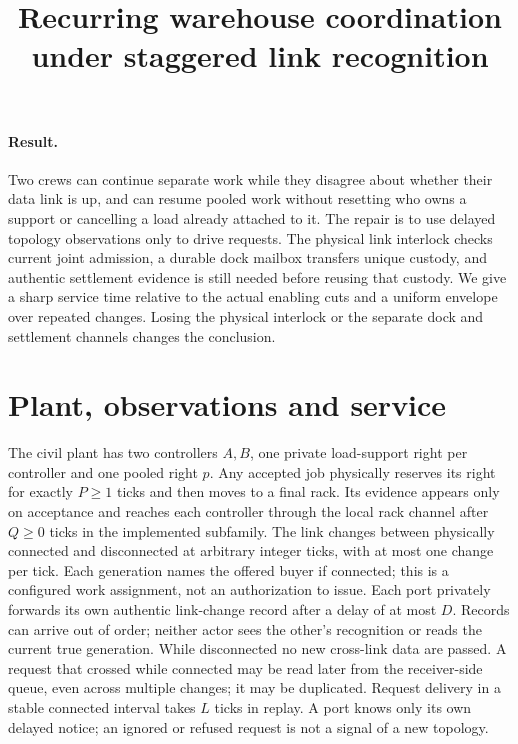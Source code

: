 \documentclass[11pt]{article}
\title{Recurring warehouse coordination under staggered link recognition}
\date{}
\begin{document}
\maketitle

\paragraph{Result.}
Two crews can continue separate work while they disagree about whether their data link is up, and can resume pooled work without resetting who owns a support or cancelling a load already attached to it. The repair is to use delayed topology observations only to drive requests. The physical link interlock checks current joint admission, a durable dock mailbox transfers unique custody, and authentic settlement evidence is still needed before reusing that custody. We give a sharp service time relative to the actual enabling cuts and a uniform envelope over repeated changes. Losing the physical interlock or the separate dock and settlement channels changes the conclusion.

\section{Plant, observations and service}
The civil plant has two controllers $A,B$, one private load-support right per controller and one pooled right $p$. Any accepted job physically reserves its right for exactly $P\ge1$ ticks and then moves to a final rack. Its evidence appears only on acceptance and reaches each controller through the local rack channel after $Q\ge0$ ticks in the implemented subfamily. The link changes between physically connected and disconnected at arbitrary integer ticks, with at most one change per tick. Each generation names the offered buyer if connected; this is a configured work assignment, not an authorization to issue. Each port privately forwards its own authentic link-change record after a delay of at most $D$. Records can arrive out of order; neither actor sees the other's recognition or reads the current true generation. While disconnected no new cross-link data are passed. A request that crossed while connected may be read later from the receiver-side queue, even across multiple changes; it may be duplicated. Request delivery in a stable connected interval takes $L$ ticks in replay. A port knows only its own delayed notice; an ignored or refused request is not a signal of a new topology.
\end{document}
